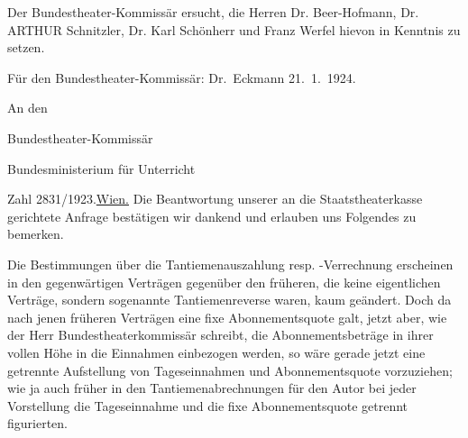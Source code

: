 \pstart
           Der Bundestheater-Kommissär
               ersucht, die Herren Dr. Beer-Hofmann, Dr. ARTHUR Schnitzler,
               Dr. Karl Schönherr und Franz Werfel hievon in Kenntnis zu setzen.\pend
           
\pstart
           Für den Bundestheater-Kommissär: \spacefill\mbox{Dr. Eckmann}\pend
           \vspace{1em}{\vspace{1\baselineskip}}
\pstart
           \raggedleft{}{\pb}21. 1. 1924.\pend
           
\pstart
           An den\pend
           
\pstart
           Bundestheater-Kommissär\pend
           
\pstart
           Bundesministerium für Unterricht\pend
           
\pstart
           Zahl 2831/1923.\hfill \uline{Wien.}\pend
           \vspace{0.5em}
\pstart
           Die Beantwortung unserer an die Staatstheaterkasse gerichtete Anfrage bestätigen wir dankend und erlauben
               uns Folgendes zu bemerken.\pend
           
\pstart
           Die Bestimmungen über die Tantiemenauszahlung resp. -Verrechnung erscheinen in den
               gegenwärtigen Verträgen gegenüber den früheren, die keine eigentlichen Verträge,
               sondern sogenannte Tantiemenreverse waren, kaum geändert. Doch da nach jenen früheren
               Verträgen eine fixe Abonnementsquote galt, jetzt aber, wie der Herr Bundestheaterkommissär schreibt, die
               Abonnementsbeträge in ihrer vollen Höhe in die Einnahmen einbezogen werden, so wäre
               gerade jetzt eine getrennte Aufstellung von Tageseinnahmen und Abonnementsquote
               vorzuziehen; wie ja auch früher in den Tantiemenabrechnungen für den Autor bei jeder
               Vorstellung die Tageseinnahme und die fixe Abonnementsquote getrennt figurierten.\pend
           
